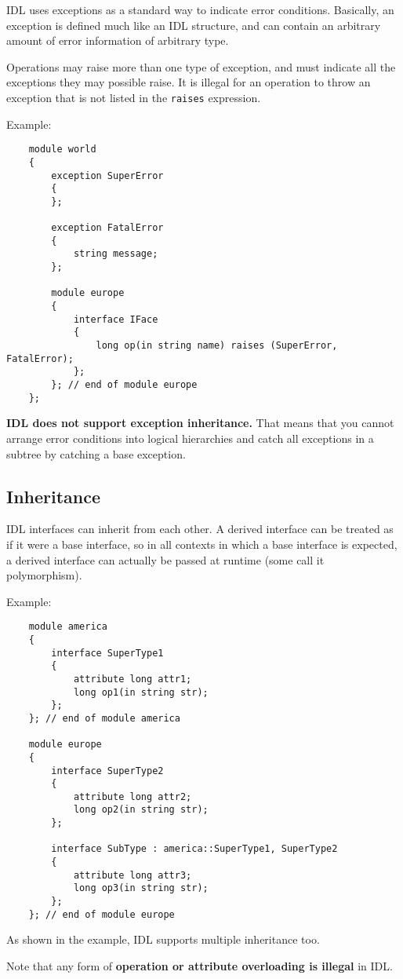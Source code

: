 IDL uses exceptions as a standard way to indicate error conditions.
Basically, an exception is defined much like an IDL structure,
and can contain an arbitrary amount of error information of
arbitrary type.

Operations may raise more than one type of exception, and
must indicate all the exceptions they may possible raise.
It is illegal for an operation to throw an exception that is
not listed in the {\tt raises} expression.

\newpage
Example:
\begin{verbatim}
    module world
    {
        exception SuperError
        {
        };

        exception FatalError
        {
            string message;
        };

        module europe
        {
            interface IFace
            {
                long op(in string name) raises (SuperError, FatalError);
            };
        }; // end of module europe
    };
\end{verbatim}
 
{\bf IDL does not support exception inheritance.} 
That means that you cannot arrange error conditions into logical 
hierarchies and catch all exceptions in a subtree by catching a
base exception.


\subsection{Inheritance}

IDL interfaces can inherit from each other. A derived interface can be
treated as if it were a base interface, so in all contexts in which a
base interface is expected, a derived interface can actually be passed
at runtime (some call it polymorphism).

\vspace{2mm}
Example:
\begin{verbatim}
    module america
    {
        interface SuperType1
        {
            attribute long attr1;
            long op1(in string str);
        };
    }; // end of module america

    module europe
    {
        interface SuperType2
        {
            attribute long attr2;
            long op2(in string str);
        };

        interface SubType : america::SuperType1, SuperType2 
        {
            attribute long attr3;
            long op3(in string str);
        };
    }; // end of module europe
\end{verbatim}
 
As shown in the example, IDL supports multiple inheritance too.

Note that any form of {\bf operation or attribute overloading is illegal} in IDL.

